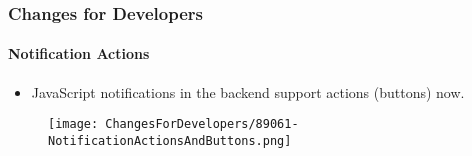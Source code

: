 %
%
%
%
%
%
%


\begin{frame}[fragile]
	\frametitle{Changes for Developers}
	\framesubtitle{Notification Actions}

	\begin{itemize}
		\item JavaScript notifications in the backend support actions (buttons) now.
	\end{itemize}

	\begin{figure}
		\texttt{[image: ChangesForDevelopers/89061-NotificationActionsAndButtons.png]}
	\end{figure}

\end{frame}


